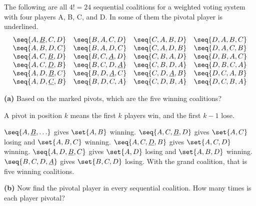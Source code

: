 \documentclass[12pt]{ximera}
\begin{document}
\begin{problem}
The following are all $4!=24$ sequential coalitions for a weighted voting system with
four players A, B, C, and D. In some of them the pivotal player is underlined.
\[
\begin{array}{cccc}
\seq{A,\underline{B},C,D} & \seq{B,A,C,D} & \seq{C,A,B,D} & \seq{D,A,B,C}\\
\seq{A,B,D,C} & \seq{B,A,D,C} & \seq{C,A,D,B} & \seq{D,A,C,B}\\
\seq{A,C,\underline{B},D} & \seq{B,C,\underline{A},D} & \seq{C,B,A,D} & \seq{D,B,A,C}\\
\seq{A,C,\underline{D},B} & \seq{B,C,D,\underline{A}} & \seq{C,B,D,A} & \seq{D,B,C,A}\\
\seq{A,D,\underline{B},C} & \seq{B,D,\underline{A},C} & \seq{C,D,\underline{A},B} & \seq{D,C,A,B}\\
\seq{A,D,\underline{C},B} & \seq{B,D,C,A} & \seq{C,D,B,A} & \seq{D,C,B,A}
\end{array}
\]

\begin{prompt}
\textbf{(a)} Based on the marked pivots, which are the five winning coalitions?

\begin{selectAll}
\end{selectAll}

\begin{hint}
A pivot in position $k$ means the first $k$ players win, and the first $k-1$ lose.
\end{hint}

\begin{feedback}
$\seq{A,\underline{B},\ldots}$ gives $\set{A,B}$ winning. $\seq{A,C,\underline{B},D}$ gives
$\set{A,C}$ losing and $\set{A,B,C}$ winning. $\seq{A,C,\underline{D},B}$ gives
$\set{A,C,D}$ winning. $\seq{A,D,\underline{B},C}$ gives $\set{A,D}$ losing and
$\set{A,B,D}$ winning. $\seq{B,C,D,\underline{A}}$ gives $\set{B,C,D}$ losing. With the
grand coalition, that is five winning coalitions.
\end{feedback}
\end{prompt}

\begin{prompt}
\textbf{(b)} Now find the pivotal player in every sequential coalition. How many times
is each player pivotal?


\end{prompt}
\end{problem}
\end{document}
